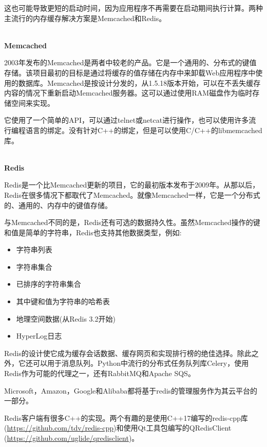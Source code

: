 这也可能导致更短的启动时间，因为应用程序不再需要在启动期间执行计算。两种主流行的内存缓存解决方案是Memcached和Redis。

\hspace*{\fill} \\ %
\noindent
\textbf{Memcached}

2003年发布的Memcached是两者中较老的产品。它是一个通用的、分布式的键值存储。该项目最初的目标是通过将缓存的值存储在内存中来卸载Web应用程序中使用的数据库。Memcached是按设计分发的，从1.5.18版本开始，可以在不丢失缓存内容的情况下重新启动Memcached服务器。这可以通过使用RAM磁盘作为临时存储空间来实现。

它使用了一个简单的API，可以通过telnet或netcat进行操作，也可以使用许多流行编程语言的绑定。没有针对C++的绑定，但是可以使用C/C++的libmemcached库。

\hspace*{\fill} \\ %
\noindent
\textbf{Redis}

Redis是一个比Memcached更新的项目，它的最初版本发布于2009年。从那以后，Redis在很多情况下都取代了Memcached。就像Memcached一样，它是一个分布式的、通用的、内存中的键值存储。

与Memcached不同的是，Redis还有可选的数据持久性。虽然Memcached操作的键和值是简单的字符串，Redis也支持其他数据类型，例如:

\begin{itemize}
\item 
字符串列表

\item 
字符串集合

\item 
已排序的字符串集合

\item 
其中键和值为字符串的哈希表

\item 
地理空间数据(从Redis 3.2开始)

\item 
HyperLog日志
\end{itemize}

Redis的设计使它成为缓存会话数据、缓存网页和实现排行榜的绝佳选择。除此之外，它还可以用于消息队列。Python中流行的分布式任务队列库Celery，使用Redis作为可能的代理之一，还有RabbitMQ和Apache SQS。

Microsoft，Amazon，Google和Alibaba都将基于redis的管理服务作为其云平台的一部分。

Redis客户端有很多C++的实现。两个有趣的是使用C++17编写的redis-cpp库(\url{https://github.com/tdv/redis-cpp})和使用Qt工具包编写的QRedisClient (\url{https://github.com/uglide/qredisclient})。

